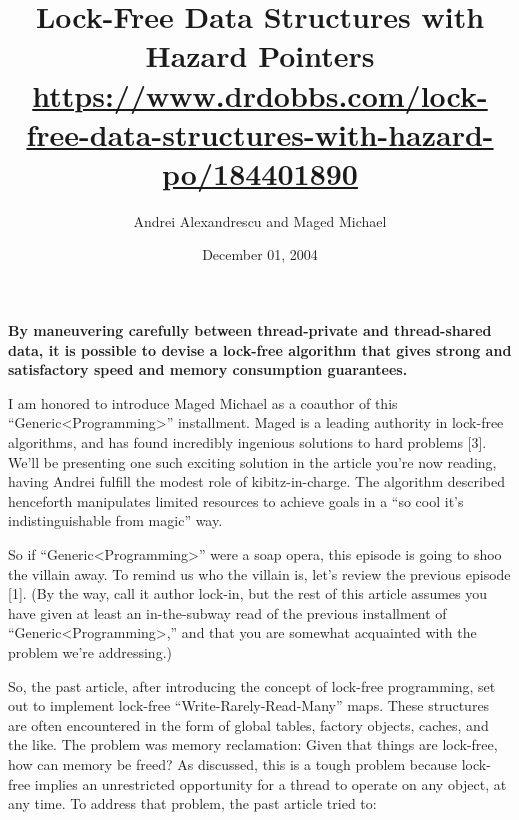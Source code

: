 \documentclass[a4paper,12pt,notitlepage,twoside,openright]{article}
\title{Lock-Free Data Structures with Hazard Pointers\\\scriptsize \url{https://www.drdobbs.com/lock-free-data-structures-with-hazard-po/184401890}}
\author{Andrei Alexandrescu and Maged Michael}
\date{December 01, 2004}
\begin{document}
\maketitle

\textbf{By maneuvering carefully between thread-private and thread-shared data, it is possible to devise a lock-free algorithm that gives strong and satisfactory speed and memory consumption guarantees.}

I am honored to introduce Maged Michael as a coauthor of this ``Generic<Programming>'' installment. Maged is a leading authority in lock-free algorithms, and has found incredibly ingenious solutions to hard problems [3]. We'll be presenting one such exciting solution in the article you're now reading, having Andrei fulfill the modest role of kibitz-in-charge. The algorithm described henceforth manipulates limited resources to achieve goals in a ``so cool it's indistinguishable from magic'' way.

So if ``Generic<Programming>'' were a soap opera, this episode is going to shoo the villain away. To remind us who the villain is, let's review the previous episode [1]. (By the way, call it author lock-in, but the rest of this article assumes you have given at least an in-the-subway read of the previous installment of ``Generic<Programming>,'' and that you are somewhat acquainted with the problem we're addressing.)

So, the past article, after introducing the concept of lock-free programming, set out to implement lock-free ``Write-Rarely-Read-Many'' maps. These structures are often encountered in the form of global tables, factory objects, caches, and the like. The problem was memory reclamation: Given that things are lock-free, how can memory be freed? As discussed, this is a tough problem because lock-free implies an unrestricted opportunity for a thread to operate on any object, at any time. To address that problem, the past article tried to:
\end{document}
